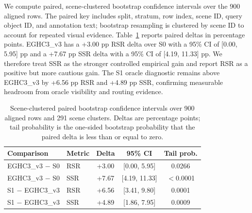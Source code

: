 We compute paired, scene-clustered bootstrap confidence intervals over the 900 aligned rows. The paired key includes split, stratum, row index, scene ID, query object ID, and annotation text; bootstrap resampling is clustered by scene ID to account for repeated visual evidence. Table~\ref{tab:bootstrap} reports paired deltas in percentage points. EGHC3\_v3 has a +3.00 pp RSR delta over S0 with a 95\% CI of [0.00, 5.95] pp and a +7.67 pp SSR delta with a 95\% CI of [4.19, 11.33] pp. We therefore treat SSR as the stronger controlled empirical gain and report RSR as a positive but more cautious gain. The S1 oracle diagnostic remains above EGHC3\_v3 by +6.56 pp RSR and +4.89 pp SSR, confirming measurable headroom from oracle visibility and routing evidence.

\begin{table}[t]
\centering
\caption{Scene-clustered paired bootstrap confidence intervals over 900 aligned rows and 291 scene clusters. Deltas are percentage points; tail probability is the one-sided bootstrap probability that the paired delta is less than or equal to zero.}
\label{tab:bootstrap}
\small
\begin{tabular}{@{}llccc@{}}
\toprule
Comparison & Metric & Delta & 95\% CI & Tail prob. \\
\midrule
EGHC3\_v3 $-$ S0 & RSR & +3.00 & [0.00, 5.95] & 0.0266 \\
EGHC3\_v3 $-$ S0 & SSR & +7.67 & [4.19, 11.33] & $<$0.0001 \\
S1 $-$ EGHC3\_v3 & RSR & +6.56 & [3.41, 9.80] & 0.0001 \\
S1 $-$ EGHC3\_v3 & SSR & +4.89 & [1.86, 7.95] & 0.0009 \\
\bottomrule
\end{tabular}
\end{table}
